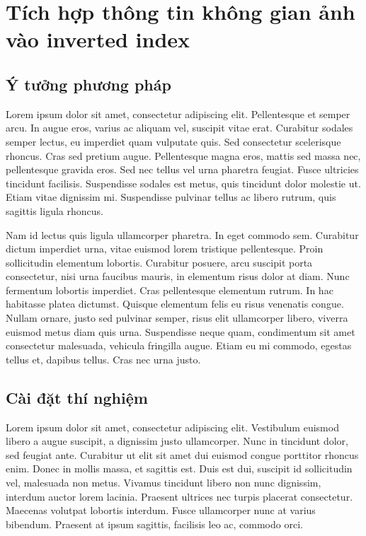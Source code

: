 \chapter{Tích hợp thông tin không gian ảnh vào inverted index}
\ifpdf
    \graphicspath{{Chapter3/Chapter3Figs/PNG/}{Chapter3/Chapter3Figs/PDF/}{Chapter3/Chapter3Figs/}}
\else
    \graphicspath{{Chapter3/Chapter3Figs/EPS/}{Chapter3/Chapter3Figs/}}
\fi

\section{Ý tưởng phương pháp}
Lorem ipsum dolor sit amet, consectetur adipiscing elit. Pellentesque et semper arcu. In augue eros, varius ac aliquam vel, suscipit vitae erat. Curabitur sodales semper lectus, eu imperdiet quam vulputate quis. Sed consectetur scelerisque rhoncus. Cras sed pretium augue. Pellentesque magna eros, mattis sed massa nec, pellentesque gravida eros. Sed nec tellus vel urna pharetra feugiat. Fusce ultricies tincidunt facilisis. Suspendisse sodales est metus, quis tincidunt dolor molestie ut. Etiam vitae dignissim mi. Suspendisse pulvinar tellus ac libero rutrum, quis sagittis ligula rhoncus.

Nam id lectus quis ligula ullamcorper pharetra. In eget commodo sem. Curabitur dictum imperdiet urna, vitae euismod lorem tristique pellentesque. Proin sollicitudin elementum lobortis. Curabitur posuere, arcu suscipit porta consectetur, nisi urna faucibus mauris, in elementum risus dolor at diam. Nunc fermentum lobortis imperdiet. Cras pellentesque elementum rutrum. In hac habitasse platea dictumst. Quisque elementum felis eu risus venenatis congue. Nullam ornare, justo sed pulvinar semper, risus elit ullamcorper libero, viverra euismod metus diam quis urna. Suspendisse neque quam, condimentum sit amet consectetur malesuada, vehicula fringilla augue. Etiam eu mi commodo, egestas tellus et, dapibus tellus. Cras nec urna justo.

\section{Cài đặt thí nghiệm}
Lorem ipsum dolor sit amet, consectetur adipiscing elit. Vestibulum euismod libero a augue suscipit, a dignissim justo ullamcorper. Nunc in tincidunt dolor, sed feugiat ante. Curabitur ut elit sit amet dui euismod congue porttitor rhoncus enim. Donec in mollis massa, et sagittis est. Duis est dui, suscipit id sollicitudin vel, malesuada non metus. Vivamus tincidunt libero non nunc dignissim, interdum auctor lorem lacinia. Praesent ultrices nec turpis placerat consectetur. Maecenas volutpat lobortis interdum. Fusce ullamcorper nunc at varius bibendum. Praesent at ipsum sagittis, facilisis leo ac, commodo orci.

